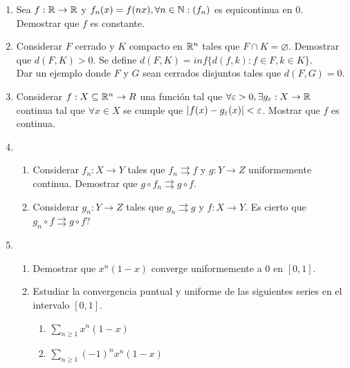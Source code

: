 \begin{enumerate}
  \item Sea $f : \mathbb{R} \to \mathbb{R}$ y $f_n(x) = f(nx), \forall n \in \mathbb{N} : (f_n)$ es equicontinua en $0$. Demostrar que $f$ es constante.
  \item Considerar $F$ cerrado y $K$ compacto en $\mathbb{R}^n$ tales que $F \cap K = \varnothing$. Demostrar que $d(F, K) > 0$. Se define $d(F, K) = inf\{ d(f, k) : f \in F, k \in K \}$. \\ Dar un ejemplo donde $F$ y $G$ sean cerrados disjuntos tales que $d(F, G) = 0$.
  \item Considerar $f: X \subseteq \mathbb{R}^n \to R$ una función tal que $\forall \varepsilon > 0, \exists g_{\varepsilon}: X \to \mathbb{R}$ continua tal que $\forall x \in X$ se cumple que $|f(x) - g_{\varepsilon}(x)| < \varepsilon$. Mostrar que $f$ es continua.
  \item \begin{enumerate}
          \item Considerar $f_n: X \to Y$ tales que $f_n \rightrightarrows f$ y $g: Y \to Z$ uniformemente continua. Demostrar que $g \circ f_n \rightrightarrows g \circ f$.
          \item Considerar $g_n : Y \to Z$ tales que $g_n \rightrightarrows g$ y $f: X \to Y$. Es cierto que $g_n \circ f \rightrightarrows g \circ f$?
        \end{enumerate}
  \item \begin{enumerate}
          \item Demostrar que $x^n(1-x)$ converge uniformemente a $0$ en $[0, 1]$.
          \item Estudiar la convergencia puntual y uniforme de las siguientes series en el intervalo $[0, 1]$. \begin{enumerate} \item $\sum_{n \geq 1} x^n(1-x)$ \item $\sum_{n \geq 1} (-1)^n x^n(1-x) $ \end{enumerate}
        \end{enumerate}
\end{enumerate}
